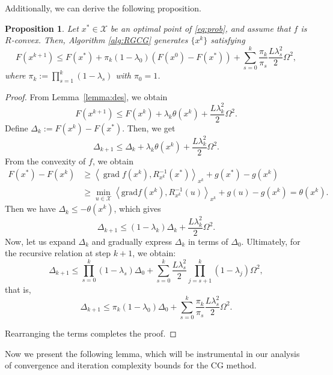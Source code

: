 \documentclass[pdflatex,sn-mathphys-num]{sn-jnl}%
\newtheorem{proposition}[theorem]{Proposition} %
\theoremstyle{definition} %
\theoremstyle{remark} %
\newcommand{\grad}{\mathrm{grad}}
\begin{document}
Additionally, we can derive the following proposition.
\begin{proposition}\label{prop:des}
    Let  $x^* \in \mathcal{X}$ be an optimal point of \eqref{eq:prob}, and assume that $f$ is $R$-convex. Then, Algorithm \ref{alg:RGCG} generates $\{x^k\}$ satisfying
    \begin{equation}
        F(x^{k+1})  \leq F(x^*)+\pi_k\left(1-\lambda_0\right)\left(F(x^0)-F(x^*)\right)+\sum_{s=0}^k \frac{\pi_k}{\pi_s} \frac{L\lambda_s^2}{2}\Omega^2,
    \end{equation}
    where $\pi_k:=\prod_{s=1}^k\left(1-\lambda_s\right)$ with $\pi_0=1$.
\end{proposition}
\begin{proof}
    From Lemma~\ref{lemma:des}, 
    we obtain
    $$F(x^{k+1}) \leq F(x^k)+ \lambda_k\theta (x^k) +\frac{L\lambda_k^2}{2}\Omega^2.$$
    Define $\Delta_k:=F(x^{k})-F(x^*)$. Then, we get
    $$
    \Delta_{k+1} \leq \Delta_k + \lambda_k \theta (x^k)+\frac{L\lambda_k^2}{2}\Omega^2.
    $$ 
    From the convexity of $f$, we obtain
    \begin{align*}
        F(x^*)-F(x^k) &\geq\left\langle\operatorname{grad} f(x^k), R_{x^k}^{-1}(x^*)\right\rangle_{x^k} + g(x^*) - g(x^k) \\&\geq \min_{u \in \mathcal{X}} \left \langle\grad f(x^k), R^{-1}_{x^k}(u)\right\rangle_{x^k}  +g(u) -g(x^k) = \theta (x^k).
    \end{align*}
    Then 
    we have $\Delta_k \leq -\theta (x^k)$, which gives
    \[
    \Delta_{k+1} \leq (1 - \lambda_k) \Delta_k + \frac{L \lambda_k^2}{2} \Omega^2.
    \]
    Now,  let us expand \(\Delta_k\) and gradually express \(\Delta_k\) in terms of \(\Delta_0\). Ultimately, for the recursive relation at step \(k+1\), we obtain:
    \[
    \Delta_{k+1} \leq \prod_{s=0}^k (1 - \lambda_s) \Delta_0 + \sum_{s=0}^k \frac{L \lambda_s^2}{2} \prod_{j=s+1}^k (1 - \lambda_j) \Omega^2,
    \]    
    that is,
    $$
    \Delta_{k+1} \leq \pi_k\left(1-\lambda_0\right) \Delta_0+\sum_{s=0}^k \frac{\pi_k}{\pi_s} \frac{L\lambda_s^2}{2}\Omega^2.
    $$
    
    \noindent Rearranging the terms completes the proof.
\end{proof}

Now we present the following lemma, which will be instrumental in our analysis of convergence and iteration complexity bounds for the CG method.
\end{document}
